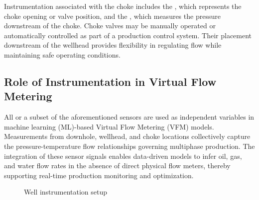\documentclass[12pt,APA]{uomthesis}
\begin{document}
Instrumentation associated with the choke includes the , which represents the choke opening or valve position, and the , which measures the pressure downstream of the choke. Choke valves may be manually operated or automatically controlled as part of a production control system. Their placement downstream of the wellhead provides flexibility in regulating flow while maintaining safe operating conditions.

\subsection{Role of Instrumentation in Virtual Flow Metering}
All or a subset of the aforementioned sensors are used as independent variables in machine learning (ML)-based Virtual Flow Metering (VFM) models. Measurements from downhole, wellhead, and choke locations collectively capture the pressure-temperature flow relationships governing multiphase production. The integration of these sensor signals enables data-driven models to infer oil, gas, and water flow rates in the absence of direct physical flow meters, thereby supporting real-time production monitoring and optimization.

\begin{figure}[!htb] 
\centering
{}
\caption{Well instrumentation setup}
\label{fig:well-instrumentation}
\end{figure}
\end{document}
